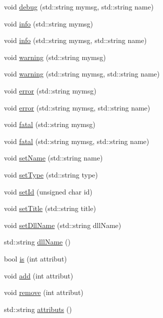 \begin{DoxyCompactItemize}
\item 
void \hyperlink{classObject_a6c9a0397ca804e04d675ed05683f5420}{debug} (std::string mymsg, std::string name)
\item 
void \hyperlink{classObject_a644fd329ea4cb85f54fa6846484b84a8}{info} (std::string mymsg)
\item 
void \hyperlink{classObject_a1ca123253dfd30fc28b156f521dcbdae}{info} (std::string mymsg, std::string name)
\item 
void \hyperlink{classObject_a65cd4fda577711660821fd2cd5a3b4c9}{warning} (std::string mymsg)
\item 
void \hyperlink{classObject_a11f101db4dd73d9391b0231818881d86}{warning} (std::string mymsg, std::string name)
\item 
void \hyperlink{classObject_a204a95f57818c0f811933917a30eff45}{error} (std::string mymsg)
\item 
void \hyperlink{classObject_ad7f6c457733082efa2f9ff5f5c8e119a}{error} (std::string mymsg, std::string name)
\item 
void \hyperlink{classObject_aad5a16aac7516ce65bd5ec02ab07fc80}{fatal} (std::string mymsg)
\item 
void \hyperlink{classObject_ae62acd3d09f716220f75f252dc38bc9a}{fatal} (std::string mymsg, std::string name)
\item 
void \hyperlink{classObject_ae30fea75683c2d149b6b6d17c09ecd0c}{setName} (std::string name)
\item 
void \hyperlink{classObject_aae534cc9d982bcb9b99fd505f2e103a5}{setType} (std::string type)
\item 
void \hyperlink{classObject_a398fe08cba594a0ce6891d59fe4f159f}{setId} (unsigned char id)
\item 
void \hyperlink{classObject_a89557dbbad5bcaa02652f5d7fa35d20f}{setTitle} (std::string title)
\item 
void \hyperlink{classObject_a870c5af919958c2136623b2d7816d123}{setDllName} (std::string dllName)
\item 
std::string \hyperlink{classObject_a2e3947f2870094c332d7454117f3ec63}{dllName} ()
\item 
bool \hyperlink{classAttrib_a704f26af560909ad22065083bb7d4c34}{is} (int attribut)
\item 
void \hyperlink{classAttrib_a235f773af19c900264a190b00a3b4ad7}{add} (int attribut)
\item 
void \hyperlink{classAttrib_a7d4ef7e32d93cb287792b87b857e79f3}{remove} (int attribut)
\item 
std::string \hyperlink{classAttrib_aee7bbf16b144887f196e1341b24f8a26}{attributs} ()
\end{DoxyCompactItemize}
